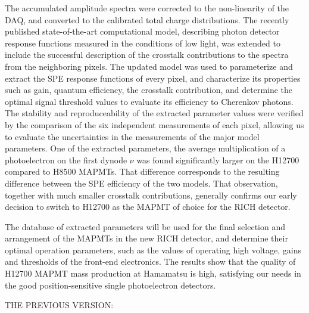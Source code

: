 The accumulated amplitude spectra were corrected to the non-linearity of the DAQ, and converted to the calibrated total charge distributions. The recently published state-of-the-art computational model, describing photon detector response functions measured in the conditions of low light, was extended to include the successful description of the crosstalk contributions to the spectra from the neighboring pixels. The updated model was used to parameterize and extract the SPE response functions of every pixel, and characterize its properties such as gain, quantum efficiency, the crosstalk contribution, and determine the optimal signal threshold values to evaluate its efficiency to Cherenkov photons. The stability and reproduceability of the extracted parameter values were verified by the comparison of the six independent measurements of each pixel, allowing us to evaluate the uncertainties in the measurements of the major model parameters. One of the extracted parameters, the average multiplication of a photoelectron on the first dynode $\nu$ was found significantly larger on the H12700 compared to H8500 MAPMTs. That difference corresponds to the resulting difference between the SPE efficiency of the two models.  That observation, together with much smaller crosstalk contributions, generally confirms our early decision to switch to H12700 as the MAPMT of choice for the RICH detector.

The database of extracted parameters will be used for the final selection and arrangement of the MAPMTs in the new RICH detector, and determine their optimal operation parameters, such as the values of operating high voltage, gains and thresholds of the front-end electronics. The results show that the quality of H12700 MAPMT mass production at Hamamatsu is high, satisfying our needs in the good position-sensitive single photoelectron detectors.

THE PREVIOUS VERSION:

